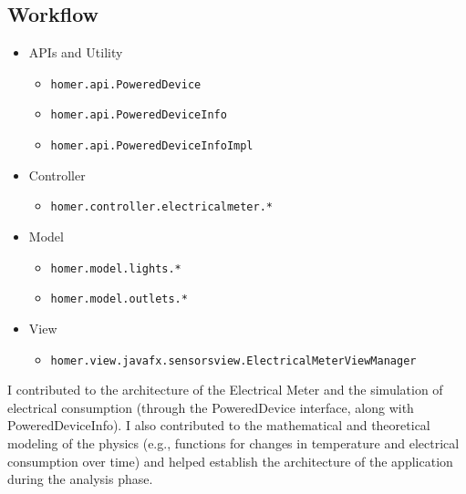 \subsection{Workflow}

\begin{itemize}
    \item APIs and Utility
    \begin{itemize}
        \item \texttt{homer.api.PoweredDevice}
        \item \texttt{homer.api.PoweredDeviceInfo}
        \item \texttt{homer.api.PoweredDeviceInfoImpl}
    \end{itemize}
    \item Controller
    \begin{itemize}
        \item \texttt{homer.controller.electricalmeter.*}
    \end{itemize}
    \item Model
    \begin{itemize}
        \item \texttt{homer.model.lights.*}
        \item \texttt{homer.model.outlets.*}
    \end{itemize}
    \item View
    \begin{itemize}
        \item \texttt{homer.view.javafx.sensorsview.ElectricalMeterViewManager}
    \end{itemize}
\end{itemize}

I contributed to the architecture of the Electrical Meter and the simulation of electrical consumption 
(through the PoweredDevice interface, along with PoweredDeviceInfo). \newline
I also contributed to the mathematical and theoretical modeling of the physics 
(e.g., functions for changes in temperature and electrical consumption over time) 
and helped establish the architecture of the application during the analysis phase.

